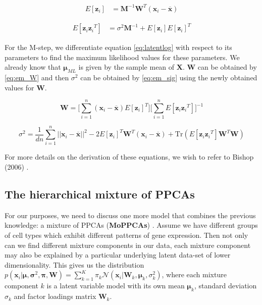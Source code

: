  \begin{equation}
     \begin{split}
         E[\bm{z}_i] &= \bm{M}^{-1}\bm{W}^T(\bm{x}_i-\overline{\bm{x}})
     \end{split}
 \end{equation}
 
 \begin{equation}
     \begin{split}
         E[\bm{z}_i{\bm{z}_i}^T] &= \sigma^2 \bm{M}^{-1} + E[\bm{z}_i]E[\bm{z}_i]^T
     \end{split}
 \end{equation}
 
 
 For the M-step, we differentiate equation \ref{eq:latentlog} with respect to its parameters to find the maximum likelihood values for these parameters. We already know that $\bm{\mu}_{ML}$ is given by the sample mean of $\bm{X}$. $\bm{W}$ can be obtained by \ref{eq:em_W} and then $\sigma^2$ can be obtained by \ref{eq:em_sig} using the newly obtained values for $\bm{W}$.
 
 \begin{equation}\label{eq:em_W}
     \bm{W} = \Bigg[\sum^n_{i=1} (\bm{x}_i-\overline{\bm{x}}) E[\bm{z}_i]^T\Bigg] \Bigg[\sum^n_{i=1} E[\bm{z}_i{\bm{z}_i}^T]\Bigg]^{-1}
 \end{equation}
 
 \begin{equation}\label{eq:em_sig}
     \sigma^2 = \frac{1}{dn} \sum^n_{i=1} ||\bm{x}_i-\overline{\bm{x}}||^2 - 2E[\bm{z}_i]^T\bm{W}^T(\bm{x}_i-\overline{\bm{x}}) + \text{Tr}(E[\bm{z}_i{\bm{z}_i}^T]\bm{W}^T\bm{W})
 \end{equation}

For more details on the derivation of these equations, we wish to refer to Bishop (2006) \cite{bishop2006pattern}.

\subsection{The hierarchical mixture of PPCAs}\label{sec:hmppca}

For our purposes, we need to discuss one more model that combines the previous knowledge: a mixture of PPCAs (\textbf{MoPPCAs}) \cite{tipping1999mixtures}. Assume we have different groups of cell types which exhibit different patterns of gene expression. Then not only can we find different mixture components in our data, each mixture component may also be explained by a particular underlying latent data-set of lower dimensionality. This gives us the distribution $p(\bm{x}_i|\bm{\mu}, \bm{\sigma}^2, \bm{\pi}, \bm{W}) = \sum^K_{k=1}\pi_k \mathcal{N}(\bm{x}_i|\bm{W}_k, \bm{\mu}_k, \sigma_k^2)$, where each mixture component $k$ is a latent variable model with its own mean $\bm{\mu}_k$, standard deviation $\sigma_k$ and factor loadings matrix $\bm{W}_k$. 

